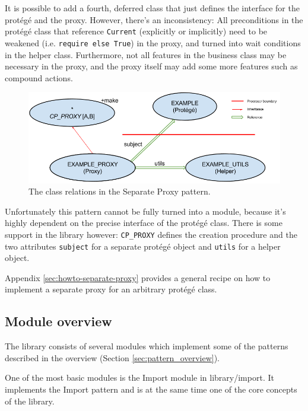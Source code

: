 \documentclass[a4paper,10pt]{article}
\newcommand{\dir} [1] [] {#1}
\begin{document}
It is possible to add a fourth, deferred class that just defines the interface for the protégé and the proxy.
However, there's an inconsistency: 
All preconditions in the protégé class that reference \lstinline!Current! (explicitly or implicitly) need to be weakened (i.e. \lstinline!require else True!) in the proxy, and turned into wait conditions in the helper class.
Furthermore, not all features in the business class may be necessary in the proxy, and the proxy itself may add some more features such as compound actions.

\begin{figure}[h]
\label{fig:separate-proxy}
\includegraphics[width=\textwidth]{separate_proxy.png}
\caption{The class relations in the Separate Proxy pattern.}
\end{figure}

Unfortunately this pattern cannot be fully turned into a module, because it's highly dependent on the precise interface of the protégé class.
There is some support in the library however: 
\lstinline!CP_PROXY! defines the creation procedure and the two attributes \lstinline!subject! for a separate protégé object and \lstinline!utils! for a helper object.

Appendix \ref{sec:howto-separate-proxy} provides a general recipe on how to implement a separate proxy for an arbitrary protégé class.

\subsection {Module overview}
\label{sec:module-overview}

The library consists of several modules which implement some of the patterns described in the overview (Section \ref{sec:pattern_overview}).

One of the most basic modules is the Import module in \dir{library/import}.
It implements the Import  pattern  and is at the same time one of the core concepts of the library.
\end{document}
